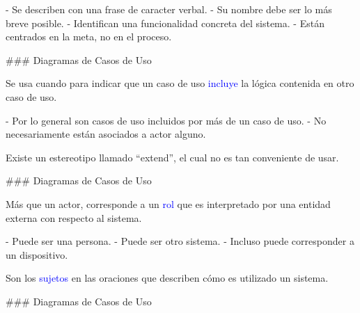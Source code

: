 - Se describen con una frase de caracter verbal.
- Su nombre debe ser lo más breve posible.
- Identifican una funcionalidad concreta del sistema.
- Están centrados en la meta, no en el proceso.

\columnsend

### Diagramas de Casos de Uso

\newline

\columnsbegin


\centering{}

 Se usa cuando para indicar que un caso de uso \textcolor{blue}{incluye} 
la lógica contenida en otro caso de uso.

- Por lo general son casos de uso incluidos por más de un caso de uso.
- No necesariamente están asociados a actor alguno.

Existe un estereotipo llamado ``extend'', el cual no es tan conveniente de usar.

\columnsend

### Diagramas de Casos de Uso

\newline

\columnsbegin


\centering{}

 Más que un actor, corresponde a un \textcolor{blue}{rol} que es interpretado por una entidad
externa con respecto al sistema.

- Puede ser una persona.
- Puede ser otro sistema.
- Incluso puede corresponder a un dispositivo.

Son los \textcolor{blue}{sujetos} en las oraciones que describen cómo es utilizado un sistema.

\columnsend

### Diagramas de Casos de Uso

